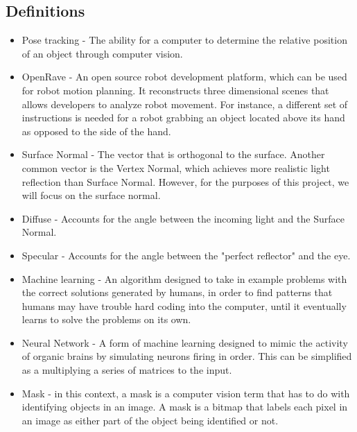 \documentclass[10pt,journal,compsoc, draftclsnofoot,onecolumn]{IEEEtran}
\begin{document}
\subsection{Definitions}
\begin{itemize}
\item Pose tracking - The ability for a computer to determine the relative position of an object through computer vision.

\item OpenRave - An open source robot development platform, which can be used for robot motion planning. It reconstructs three dimensional scenes that allows developers to analyze robot movement. For instance, a different set of instructions is needed for a robot grabbing an object located above its hand as opposed to the side of the hand.

\item Surface Normal - The vector that is orthogonal to the surface. Another common vector is the Vertex Normal, which achieves more realistic light reflection than Surface Normal. However, for the purposes of this project, we will focus on the surface normal.

\item Diffuse - Accounts for the angle between the incoming light and the Surface Normal.

\item Specular - Accounts for the angle between the "perfect reflector" and the eye.

\item Machine learning -  An algorithm designed to take in example problems with the correct solutions generated by humans, in order to find patterns that humans may have trouble hard coding into the computer, until it eventually learns to solve the problems on its own.

\item Neural Network - A form of machine learning designed to mimic the activity of organic brains by simulating neurons firing in order. This can be simplified as a multiplying a series of matrices to the input.

\item Mask - in this context, a mask is a computer vision term that has to do with identifying objects in an image. A mask is a bitmap that labels each pixel in an image as either part of the object being identified or not.

\end{itemize}
\end{document}
